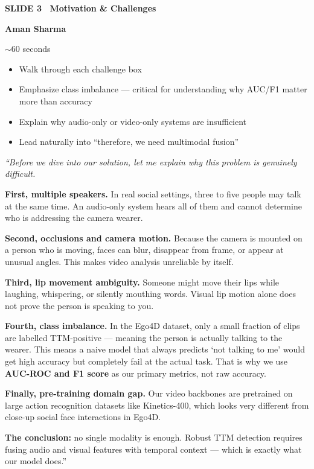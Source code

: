 \documentclass[11pt, a4paper]{article}
\newcommand{\slideheading}[3]{%
  \vspace{0.6cm}
  \begin{tcolorbox}[slidebox]
    \textbf{\color{NavyBlue}SLIDE #1 \textemdash\ #2}\\[2pt]
    \begin{tcolorbox}[presenterbox, title=Presenter(s)]
      \color{AccBlue}\bfseries #3
    \end{tcolorbox}
  \end{tcolorbox}
}
\newcommand{\timing}[1]{%
  \begin{tcolorbox}[timebox, title=Suggested Time]
    \color{AccOrange} #1
  \end{tcolorbox}
}
\newcommand{\keypoints}[1]{%
  \begin{tcolorbox}[keybox, title=Key Points to Cover]
    #1
  \end{tcolorbox}
}
\newcommand{\script}[1]{%
  \begin{mdframed}[
    backgroundcolor=white,
    linecolor=MidText!40,
    linewidth=0.5pt,
    leftmargin=0pt,
    rightmargin=0pt,
    innerleftmargin=10pt,
    innerrightmargin=8pt,
    innertopmargin=8pt,
    innerbottommargin=8pt,
    roundcorner=3pt
  ]
  \itshape\color{MidText}
  #1
  \end{mdframed}
}
\begin{document}
\slideheading{3}{Motivation \& Challenges}{Aman Sharma}

\timing{$\sim$60 seconds}

\keypoints{%
\begin{itemize}[leftmargin=*, itemsep=2pt]
  \item Walk through each challenge box
  \item Emphasize class imbalance --- critical for understanding why AUC/F1 matter more than accuracy
  \item Explain why audio-only or video-only systems are insufficient
  \item Lead naturally into ``therefore, we need multimodal fusion''
\end{itemize}
}

\script{%
``Before we dive into our solution, let me explain why this problem is genuinely difficult.

\textbf{First, multiple speakers.} In real social settings, three to five people may talk at the same time. An audio-only system hears all of them and cannot determine who is addressing the camera wearer.

\textbf{Second, occlusions and camera motion.} Because the camera is mounted on a person who is moving, faces can blur, disappear from frame, or appear at unusual angles. This makes video analysis unreliable by itself.

\textbf{Third, lip movement ambiguity.} Someone might move their lips while laughing, whispering, or silently mouthing words. Visual lip motion alone does not prove the person is speaking to you.

\textbf{Fourth, class imbalance.} In the Ego4D dataset, only a small fraction of clips are labelled TTM-positive --- meaning the person is actually talking to the wearer. This means a naive model that always predicts `not talking to me' would get high accuracy but completely fail at the actual task. That is why we use \textbf{AUC-ROC and F1 score} as our primary metrics, not raw accuracy.

\textbf{Finally, pre-training domain gap.} Our video backbones are pretrained on large action recognition datasets like Kinetics-400, which looks very different from close-up social face interactions in Ego4D.

\textbf{The conclusion:} no single modality is enough. Robust TTM detection requires fusing audio and visual features with temporal context --- which is exactly what our model does.''
}
\end{document}
